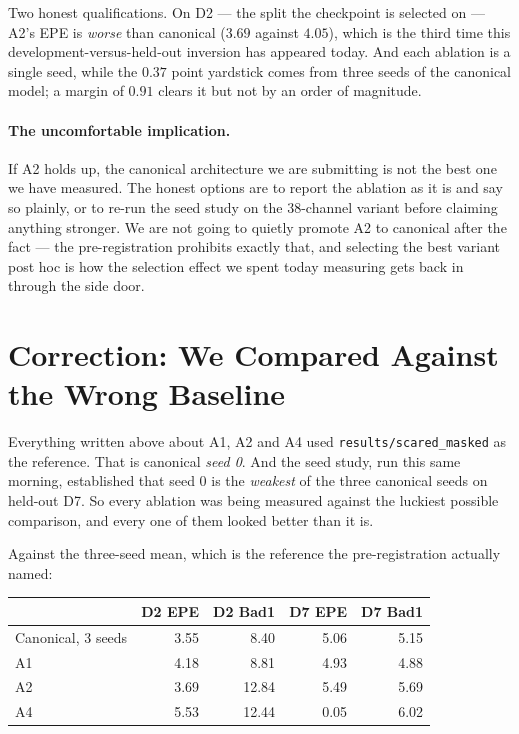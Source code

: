 \documentclass[11pt,a4paper]{article}
\begin{document}
Two honest qualifications. On D2 --- the split the checkpoint is selected
on --- A2's EPE is \emph{worse} than canonical ($3.69$ against $4.05$),
which is the third time this development-versus-held-out inversion has
appeared today. And each ablation is a single seed, while the $0.37$ point
yardstick comes from three seeds of the canonical model; a margin of
$0.91$ clears it but not by an order of magnitude.

\paragraph{The uncomfortable implication.} If A2 holds up, the canonical
architecture we are submitting is not the best one we have measured. The
honest options are to report the ablation as it is and say so plainly, or
to re-run the seed study on the $38$-channel variant before claiming
anything stronger. We are not going to quietly promote A2 to canonical
after the fact --- the pre-registration prohibits exactly that, and
selecting the best variant post hoc is how the selection effect we spent
today measuring gets back in through the side door.



\section*{Correction: We Compared Against the Wrong Baseline}

Everything written above about A1, A2 and A4 used
\texttt{results/scared\_masked} as the reference. That is canonical
\emph{seed 0}. And the seed study, run this same morning, established that
seed 0 is the \emph{weakest} of the three canonical seeds on held-out D7.
So every ablation was being measured against the luckiest possible
comparison, and every one of them looked better than it is.

Against the three-seed mean, which is the reference the pre-registration
actually named:

\begin{center}
\footnotesize
\begin{tabular}{@{}lrrrr@{}}
\toprule
& D2 EPE & D2 Bad1 & D7 EPE & D7 Bad1 \\
\midrule
Canonical, 3 seeds & 3.55 & 8.40 & 5.06 & 5.15 \\
A1 & 4.18 & 8.81 & 4.93 & 4.88 \\
A2 & 3.69 & 12.84 & 5.49 & 5.69 \\
A4 & 5.53 & 12.44 & 0.05 & 6.02 \\
\bottomrule
\end{tabular}
\end{center}
\end{document}
